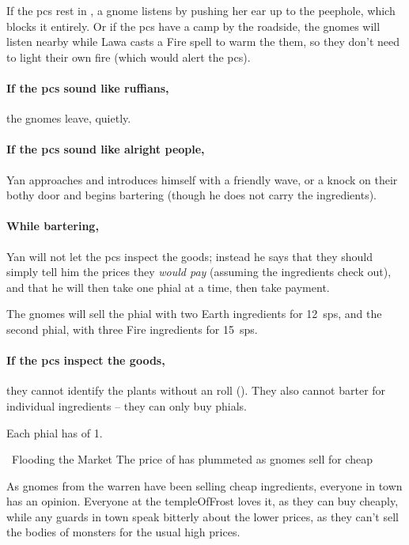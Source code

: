 If the \glspl{pc} rest in , a gnome listens by pushing her ear up to the peephole, which blocks it entirely.
Or if the \glspl{pc} have a camp by the roadside, the gnomes will listen nearby while Lawa casts a Fire spell to warm the them, so they don't need to light their own fire (which would alert the \glspl{pc}).

\paragraph{If the \glspl{pc} sound like ruffians,}
the gnomes leave, quietly.

\paragraph{If the \glspl{pc} sound like alright people,}
Yan approaches and introduces himself with a friendly wave, or a knock on their \gls{bothy} door and begins bartering (though he does not carry the \glspl{ingredient}).

\paragraph{While bartering,}
Yan will not let the \glspl{pc} inspect the goods; instead he says that they should simply tell him the prices they \textit{would pay} (assuming the \glspl{ingredient} check out), and that he will then take one phial at a time, then take payment.

\Yan[\rations]

The gnomes will sell the phial with two Earth \glspl{ingredient} for 12~\glspl{sp}, and the second phial, with three Fire \glspl{ingredient} for 15~\glspl{sp}.

\paragraph{If the \glspl{pc} inspect the goods,}
they cannot identify the plants without an  roll (\tn[12]).
They also cannot barter for individual \glspl{ingredient} -- they can only buy phials.

Each phial has  of 1.

{\squash~Flooding the Market}%
{The price of  has plummeted as gnomes sell for cheap}%

\begin{exampletext}
  As gnomes from the \gls{warren} have been selling cheap \glspl{ingredient}, everyone in town has an opinion.
  Everyone at the \gls{templeOfFrost} loves it, as they can buy cheaply, while any \glspl{guard} in town speak bitterly about the lower prices, as they can't sell the bodies of \glspl{monster} for the usual high prices.
\end{exampletext}

